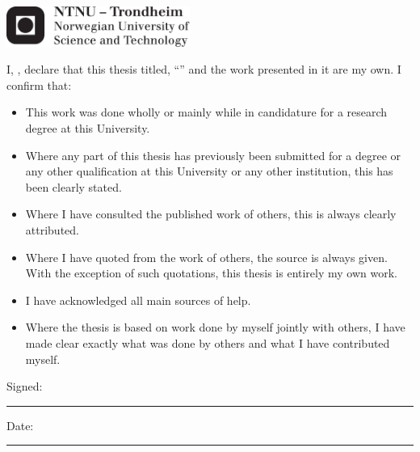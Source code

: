 \documentclass[
12pt, %
english, %
onehalfspacing, %
rnolistspacing, %
headsepline, %
]{MastersDoctoralThesis} %
\begin{document}
\begin{titlepage}
\begin{center}
\vfill

\includegraphics[width=6cm]{Figures/Logo} %

\vfill
\end{center}
\end{titlepage}


\begin{declaration}
\addchaptertocentry{\authorshipname} %
\noindent I, \authorname, declare that this thesis titled, \enquote{\ttitle} and the work presented in it are my own. I confirm that:

\begin{itemize}
\item This work was done wholly or mainly while in candidature for a research degree at this University.
\item Where any part of this thesis has previously been submitted for a degree or any other qualification at this University or any other institution, this has been clearly stated.
\item Where I have consulted the published work of others, this is always clearly attributed.
\item Where I have quoted from the work of others, the source is always given. With the exception of such quotations, this thesis is entirely my own work.
\item I have acknowledged all main sources of help.
\item Where the thesis is based on work done by myself jointly with others, I have made clear exactly what was done by others and what I have contributed myself.\\
\end{itemize}

\noindent Signed:\\
\rule[0.5em]{25em}{0.5pt} %

\noindent Date:\\
\rule[0.5em]{25em}{0.5pt} %
\end{declaration}
\end{document}
